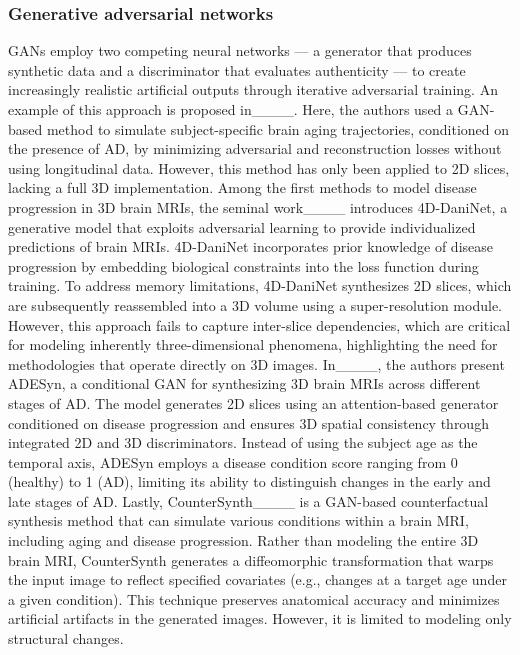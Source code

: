 \subsubsection{Generative adversarial networks}
GANs employ two competing neural networks — a generator that produces synthetic data and a discriminator that evaluates authenticity — to create increasingly realistic artificial outputs through iterative adversarial training. An example of this approach is proposed in____. Here, the authors used a GAN-based method to simulate subject-specific brain aging trajectories, conditioned on the presence of AD, by minimizing adversarial and reconstruction losses without using longitudinal data. However, this method has only been applied to 2D slices, lacking a full 3D implementation. Among the first methods to model disease progression in 3D brain MRIs, the seminal work____ introduces 4D-DaniNet, a generative model that exploits adversarial learning to provide individualized predictions of brain MRIs. 4D-DaniNet incorporates prior knowledge of disease progression by embedding biological constraints into the loss function during training. To address memory limitations, 4D-DaniNet synthesizes 2D slices, which are subsequently reassembled into a 3D volume using a super-resolution module. However, this approach fails to capture inter-slice dependencies, which are critical for modeling inherently three-dimensional phenomena, highlighting the need for methodologies that operate directly on 3D images. In____, the authors present ADESyn, a conditional GAN for synthesizing 3D brain MRIs across different stages of AD. The model generates 2D slices using an attention-based generator conditioned on disease progression and ensures 3D spatial consistency through integrated 2D and 3D discriminators. Instead of using the subject age as the temporal axis, ADESyn employs a disease condition score ranging from 0 (healthy) to 1 (AD), limiting its ability to distinguish changes in the early and late stages of AD. Lastly, CounterSynth____ is a GAN-based counterfactual synthesis method that can simulate various conditions within a brain MRI, including aging and disease progression. Rather than modeling the entire 3D brain MRI, CounterSynth generates a diffeomorphic transformation that warps the input image to reflect specified covariates (e.g., changes at a target age under a given condition). This technique preserves anatomical accuracy and minimizes artificial artifacts in the generated images. However, it is limited to modeling only structural changes.

